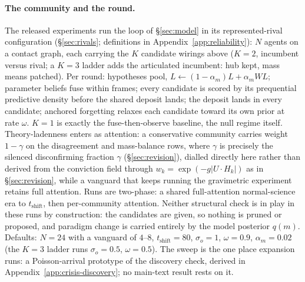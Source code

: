 \documentclass[runningheads]{llncs}
\begin{document}
\paragraph{The community and the round.}
The released experiments run the loop of \S\ref{sec:model} in its represented-rival
configuration (\S\ref{sec:rivals}; definitions in Appendix~\ref{app:reliability}): $N$
agents on a contact graph, each carrying the $K$ candidate wirings above ($K{=}2$,
incumbent versus rival; a $K{=}3$ ladder adds the articulated incumbent: hub kept,
mass means patched). Per round: hypotheses pool,
$L\leftarrow(1-\alpha_m)L+\alpha_m WL$; parameter beliefs fuse within frames; every
candidate is scored by its prequential predictive density before the shared deposit lands;
the deposit lands in every candidate; anchored forgetting relaxes each candidate toward its
own prior at rate $\omega$. $K{=}1$ is exactly the fuse-then-observe baseline, the null
regime itself. Theory-ladenness enters as attention: a conservative community carries
weight $1-\gamma$ on the disagreement and mass-balance rows, where $\gamma$ is precisely
the silenced disconfirming fraction $\gamma$ (\S\ref{sec:revision}), dialled directly here rather
than derived from the conviction field through $w_k=\exp(-g|U\!\cdot\!H_k|)$ as in
\S\ref{sec:revision}, while a vanguard that keeps running the gravimetric experiment
retains full attention. Runs are two-phase: a shared full-attention normal-science era to
$t_{\text{shift}}$, then per-community attention. Neither structural check is in play in
these runs by construction: the candidates are given, so nothing is pruned or proposed, and
paradigm change is carried entirely by the model posterior $q(m)$. Defaults:
$N{=}24$ with a vanguard of $4$--$8$, $t_{\text{shift}}{=}80$, $\sigma_o{=}1$,
$\omega{=}0.9$, $\alpha_m{=}0.02$ (the $K{=}3$ ladder runs $\sigma_o{=}0.5$,
$\omega{=}0.5$). The sweep is the one place expansion runs: a Poisson-arrival
prototype of the discovery check, derived in Appendix~\ref{app:crisis-discovery}; no
main-text result rests on it.
\end{document}
